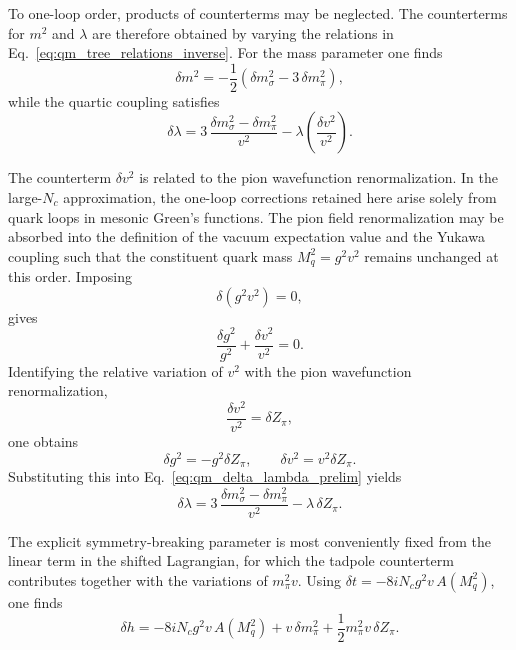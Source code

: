 To one-loop order, products of counterterms may be neglected. The
counterterms for \(m^2\) and \(\lambda\) are therefore obtained by
varying the relations in Eq.~\eqref{eq:qm_tree_relations_inverse}. For
the mass parameter one finds
\begin{equation}
\delta m^2
=
-\frac{1}{2}
\left(
\delta m_\sigma^2
-
3\,\delta m_\pi^2
\right),
\label{eq:qm_delta_m2}
\end{equation}
while the quartic coupling satisfies
\begin{equation}
\delta\lambda
=
3\,\frac{\delta m_\sigma^2-\delta m_\pi^2}{v^2}
-
\lambda
\left(
\frac{\delta v^2}{v^2}
\right).
\label{eq:qm_delta_lambda_prelim}
\end{equation}

The counterterm \(\delta v^2\) is related to the pion wavefunction
renormalization. In the large-\(N_c\) approximation, the one-loop
corrections retained here arise solely from quark loops in mesonic
Green's functions.
The pion field renormalization may be absorbed into the definition of
the vacuum expectation value and the Yukawa coupling such that the
constituent quark mass \(M_q^2 = g^2 v^2\) remains unchanged at this
order. Imposing
\begin{equation}
\delta(g^2 v^2) = 0,
\end{equation}
gives
\begin{equation}
\frac{\delta g^2}{g^2} + \frac{\delta v^2}{v^2} = 0.
\end{equation}
Identifying the relative variation of \(v^2\) with the pion
wavefunction renormalization,
\begin{equation}
\frac{\delta v^2}{v^2} = \delta Z_\pi,
\end{equation}
one obtains
\begin{equation}
\delta g^2 = - g^2 \delta Z_\pi,
\qquad
\delta v^2 = v^2 \delta Z_\pi.
\label{eq:qm_delta_gv_relation}
\end{equation}
Substituting this into Eq.~\eqref{eq:qm_delta_lambda_prelim} yields
\begin{equation}
\delta\lambda
=
3\,\frac{\delta m_\sigma^2-\delta m_\pi^2}{v^2}
-
\lambda\,\delta Z_\pi .
\label{eq:qm_delta_lambda}
\end{equation}

The explicit symmetry-breaking parameter is most conveniently fixed
from the linear term in the shifted Lagrangian, for which the tadpole
counterterm contributes together with the variations of
\(m_\pi^2 v\). Using \(\delta t=-8 i N_c g^2 v\,A(M_q^2)\), one finds
\begin{equation}
\delta h
=
-8 i N_c g^2 v\,A(M_q^2)
+
v\,\delta m_\pi^2
+
\frac{1}{2}m_\pi^2 v\,\delta Z_\pi .
\label{eq:qm_delta_h}
\end{equation}

